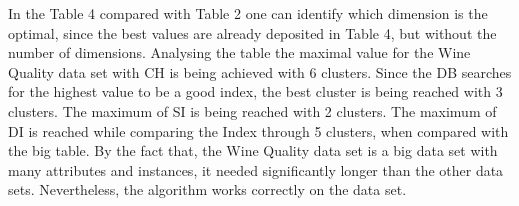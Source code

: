 In the Table 4 compared with Table 2 one can identify which dimension is the optimal, since the best values are already deposited in Table 4, but without the number of dimensions.
Analysing the table the maximal value for the Wine Quality data set with CH is being achieved with 6 clusters.\newline
Since the DB searches for the highest value to be a good index, the best cluster is being reached with  3 clusters. The maximum of SI is being reached with 2 clusters. The maximum of DI is reached while comparing the Index through 5 clusters, when compared with the big table. \newline
By the fact that, the Wine Quality data set is a big data set with many attributes and instances, it needed significantly longer than the other data sets. Nevertheless, the algorithm works correctly on the data set. \newline
